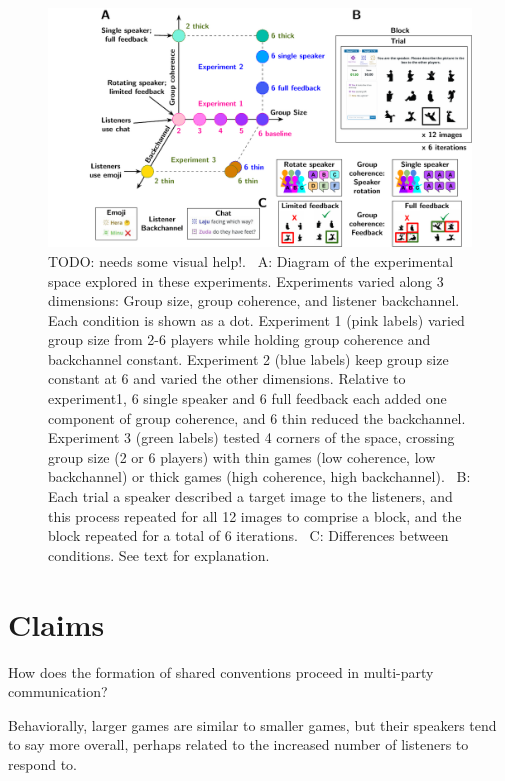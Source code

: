 \documentclass[
  english,
  a4paper,
]{article}
\begin{document}
\begin{figure}[t!]

{\centering \includegraphics[width=1\linewidth]{expt-diagram} 

}

\caption{TODO: needs some visual help!. \ A: Diagram of the experimental space explored in these experiments. Experiments varied along 3 dimensions: Group size, group coherence, and listener backchannel. Each condition is shown as a dot. Experiment 1 (pink labels) varied group size from 2-6 players while holding group coherence and backchannel constant. Experiment 2 (blue labels) keep group size constant at 6 and varied the other dimensions. Relative to experiment1, 6 single speaker and 6 full feedback each added one component of group coherence, and 6 thin reduced the backchannel. Experiment 3 (green labels) tested 4 corners of the space, crossing group size (2 or 6 players) with thin games (low coherence, low backchannel) or thick games (high coherence, high backchannel). \  B: Each trial a speaker described a target image to the listeners, and this process repeated for all 12 images to comprise a block, and the block repeated for a total of 6 iterations. \ C: Differences between conditions. See text for explanation.}\label{fig:diagram}
\end{figure}

\hypertarget{claims}{%
\section{Claims}\label{claims}}

How does the formation of shared conventions proceed in multi-party communication?

Behaviorally,
larger games are similar to smaller games, but their speakers tend to say more overall, perhaps related
to the increased number of listeners to respond to.
\end{document}
